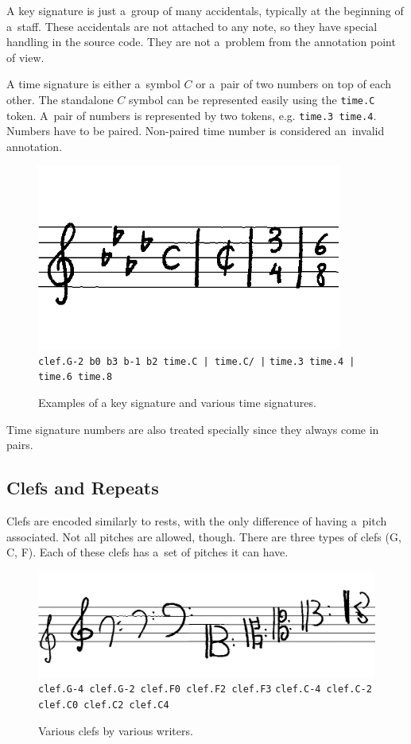 A key signature is just a~group of many accidentals, typically at the beginning of a~staff. These accidentals are not attached to any note, so they have special handling in the source code. They are not a~problem from the annotation point of view.

A time signature is either a~symbol $C$ or a~pair of two numbers on top of each other. The standalone $C$ symbol can be represented easily using the \verb`time.C` token. A~pair of numbers is represented by two tokens, e.g. \verb`time.3 time.4`. Numbers have to be paired. Non-paired time number is considered an~invalid annotation.

\begin{figure}[h]
    \centering
    \includegraphics[width=100mm]{../img/key-and-time-signatures}
    \verb`clef.G-2 b0 b3 b-1 b2 time.C | time.C/ |`
    \verb`time.3 time.4 | time.6 time.8`
    \caption{Examples of a key signature and various time signatures.}
    \label{fig4:KeyAndTimeSignatures}
\end{figure}

Time signature numbers are also treated specially since they always come in pairs.


\subsection{Clefs and Repeats}

Clefs are encoded similarly to rests, with the only difference of having a~pitch associated. Not all pitches are allowed, though. There are three types of clefs (G, C, F). Each of these clefs has a~set of pitches it can have.

\begin{figure}[h]
    \centering
    \includegraphics[width=120mm]{../img/clefs}
    \verb`clef.G-4 clef.G-2 clef.F0 clef.F2 clef.F3`
    \verb`clef.C-4 clef.C-2 clef.C0 clef.C2 clef.C4`
    \caption{Various clefs by various writers.}
    \label{fig4:Clefs}
\end{figure}

